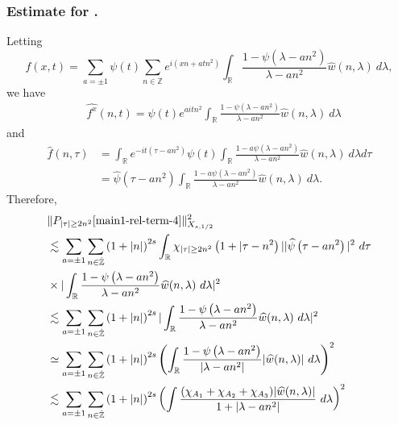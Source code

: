 \documentclass[12pt,reqno]{amsart}
\numberwithin{equation}{section}  %
\renewcommand{\cref}{\Cref}
\newcommand{\rr}{\mathbb{R}}
\newcommand{\zz}{\mathbb{Z}}
\newcommand{\zzdot}{\dot{\zz}}
\newcommand{\wh}{\widehat}
\begin{document}
\subsubsection{Estimate for \cref{main1-rel-term-4}.}
Letting $$f(x,t) = \sum_{a = \pm 1} \psi(t) \sum_{n \in \zz} e^{i\left( xn +
atn^{2} \right)}  
\int_\rr \frac{1 - \psi\left( \lambda - an^{2} \right)}{\lambda - an^{2}} 
\wh{w} \left( n, \lambda \right) \ d \lambda,$$ we have
%
%
\begin{equation*}
	\begin{split}
		& \wh{f^x}(n, t) = 
		\psi(t) e^{aitn^{2}} \int_\rr
		\frac{1 - \psi\left( \lambda - an^{2} \right)}{\lambda - an^{2}} 
		\wh{w}(n, \lambda) \ d \lambda
	\end{split}
\end{equation*}
and
\begin{equation*}
	\begin{split}
		 \wh{f}\left( n, \tau \right)
		 & = \int_\rr e^{-it\left( \tau - an^{2} 
		\right)} \psi(t) \int_\rr \frac{1 - a\psi\left( 
		\lambda - an^{2} 
		\right)}{\lambda - an^{2}} \wh{w}(n, \lambda) \ d \lambda d \tau
		\\
    & = \wh{\psi}\left( \tau - an^{2} \right) \int_\rr 
		\frac{1 - a\psi\left( 
		\lambda - an^{2} 
		\right)}{\lambda - an^{2}} \wh{w}(n, \lambda) \ d \lambda.
	\end{split}
\end{equation*}
Therefore,
%
%
\begin{equation}
  \label{iu}
	\begin{split}
	& \| P_{| \tau | \ge 2n^{2}}\cref{main1-rel-term-4} \|_{X_{s,1/2}}^{2} 
		\\
    & \lesssim 
    \sum_{a = \pm 1} \sum_{n \in \zzdot} \left (1 + |n| \right)^{2s}
    \int_\rr \chi_{|\tau| \ge 2n^{2}}\left( 1 + | \tau - n^{2} \right ) | | \wh{\psi}\left(
    \tau - an^{2} \right) |^2 \ d \tau 
		\\
		& \times |
		\int_\rr \frac{1 - \psi\left( \lambda - an^{2} \right)}{\lambda -
		an^{2}} \wh{w}(n, \lambda) \ d \lambda |^2  
		\\
		& \lesssim 
\sum_{a = \pm 1}\sum_{n \in \zzdot} \left (1 + |n| \right )^{2s} | \int_\rr
		\frac{1 - \psi\left( \lambda - an^{2} \right)}{\lambda - an^{2}}
		\wh{w}(n, \lambda) \ d\lambda |^2 
		\\
    & \simeq  \sum_{a = \pm 1} \sum_{n \in \zzdot} \left (1 + |n| \right )^{2s}  \left ( \int_\rr
		\frac{1 - \psi\left( \lambda - an^{2} \right)}{|\lambda - an^{2}|}
		|\wh{w}(n, \lambda) | \ d\lambda \right )^2
		\\
    & \lesssim \sum_{a = \pm 1} \sum_{n \in \zzdot} \left (1 + |n| \right )^{2s}  \left ( \int
		\frac{(\chi_{A_{1}} + \chi_{A_{2}}+ \chi_{A_{3}})|\wh{w}(n, \lambda) |}{1 + |\lambda - an^{2}|}
		\ d\lambda \right )^2 
  \end{split}
\end{equation}
\end{document}

